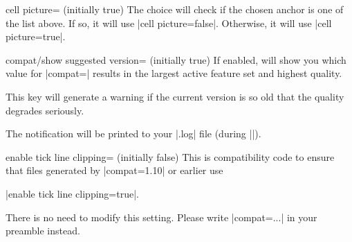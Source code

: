 {\begin{pgfplotskey}{cell picture= (initially true)}
    The choice  will check if the chosen anchor is
    one of the list above. If so, it will use |cell picture=false|. Otherwise,
    it will use |cell picture=true|.
\end{pgfplotskey}

\begin{pgfplotskey}{compat/show suggested version= (initially true)}
    If enabled, \PGFPlots{} will show you which value for
    |compat=| results in the largest active feature set and
    highest quality.

    This key will generate a warning if the current version is so old that the
    quality degrades seriously.

    The notification will be printed to your |.log| file (during
    ||).
\end{pgfplotskey}

\begin{pgfplotskey}{enable tick line clipping= (initially false)}
	This is compatibility code to ensure that files generated by |compat=1.10| or earlier use 
	
	|enable tick line clipping=true|.

	There is no need to modify this setting. Please write |compat=...| in your preamble instead.
\end{pgfplotskey}
}
